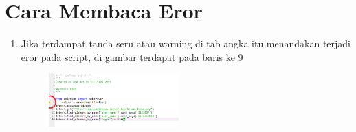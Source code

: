 \chapter*{Cara Membaca Eror }

\begin{enumerate}
	\item Jika terdampat tanda seru atau warning di tab angka itu menandakan terjadi eror pada script, di gambar terdapat pada baris ke 9 
	\begin{figure} [h]
	\includegraphics[width=5cm]{identasi/1.png}
	\centering
	\end{figure}
	
	\end{enumerate}